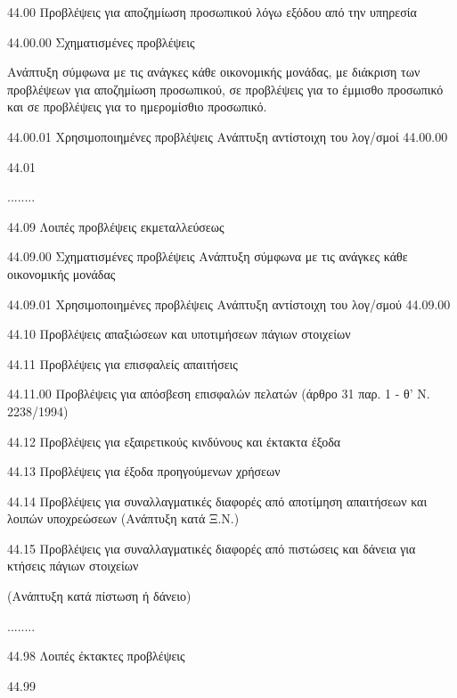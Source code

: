 \documentclass[A4,10pt,greek]{book}
\begin{document}
        44.00   Προβλέψεις για αποζημίωση προσωπικού λόγω εξόδου από την
                    υπηρεσία 

                    44.00.00   Σχηματισμένες προβλέψεις 

                                    Ανάπτυξη σύμφωνα με τις ανάγκες κάθε οικονομικής μονάδας,
                                    με διάκριση των προβλέψεων για αποζημίωση προσωπικού,
                                    σε προβλέψεις για το έμμισθο προσωπικό και σε προβλέψεις
                                    για το ημερομίσθιο προσωπικό.

                    44.00.01   Χρησιμοποιημένες προβλέψεις
                                    Ανάπτυξη αντίστοιχη του λογ/σμοί 44.00.00

        44.01

        ........

        44.09   Λοιπές προβλέψεις εκμεταλλεύσεως

                    44.09.00    Σχηματισμένες προβλέψεις
                                    Ανάπτυξη σύμφωνα με τις ανάγκες κάθε οικονομικής μονάδας

                    44.09.01    Χρησιμοποιημένες προβλέψεις
                                    Ανάπτυξη αντίστοιχη του λογ/σμού 44.09.00

        44.10   Προβλέψεις απαξιώσεων και υποτιμήσεων πάγιων στοιχείων 

        44.11   Προβλέψεις για επισφαλείς απαιτήσεις 

                    44.11.00 Προβλέψεις για απόσβεση επισφαλών πελατών
                                    (άρθρο 31 παρ. 1 - θ' Ν. 2238/1994)

        44.12   Προβλέψεις για εξαιρετικούς κινδύνους και έκτακτα έξοδα 

        44.13   Προβλέψεις για έξοδα προηγούμενων χρήσεων 

        44.14   Προβλέψεις για συναλλαγματικές διαφορές από αποτίμηση
                    απαιτήσεων και λοιπών υποχρεώσεων
                    (Ανάπτυξη κατά Ξ.Ν.)

        44.15   Προβλέψεις για συναλλαγματικές διαφορές από πιστώσεις και
                    δάνεια για κτήσεις πάγιων στοιχείων

                    (Ανάπτυξη κατά πίστωση ή δάνειο)

        ........

        44.98   Λοιπές έκτακτες προβλέψεις

        44.99 
        
\end{document}
